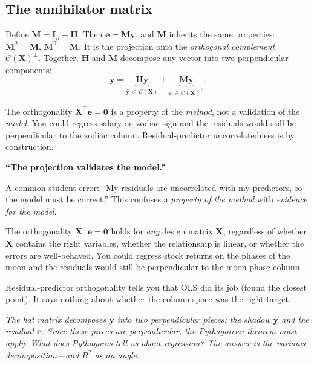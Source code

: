 \documentclass[11pt,a4paper]{article}
\theoremstyle{plain}
\theoremstyle{definition}
\newcommand{\yhat}{\hat{\bm{y}}}
\newcommand{\bX}{\bm{X}}
\newcommand{\by}{\bm{y}}
\newcommand{\be}{\bm{e}}
\newcommand{\bH}{\bm{H}}
\newcommand{\bM}{\bm{M}}
\newcommand{\bI}{\bm{I}}
\newcommand{\Col}{\mathcal{C}}
\begin{document}
\subsection{The annihilator matrix}

Define $\bM = \bI_n - \bH$. Then $\be = \bM\by$, and $\bM$ inherits the
same properties: $\bM^2 = \bM$, $\bM^\top = \bM$.
It is the projection onto the \emph{orthogonal complement}
$\Col(\bX)^\perp$.
Together, $\bH$ and $\bM$ decompose any vector into two perpendicular
components:
\[
  \by = \underbrace{\bH\by}_{\yhat\,\in\,\Col(\bX)}
      + \underbrace{\bM\by}_{\be\,\in\,\Col(\bX)^\perp}.
\]

\begin{warning}
The orthogonality $\bX^\top\be=\bm{0}$ is a property of the
\emph{method}, not a validation of the \emph{model}.
You could regress salary on zodiac sign and the residuals would still
be perpendicular to the zodiac column.
Residual-predictor uncorrelatedness is by construction.
\end{warning}

\begin{misconception}
\textbf{``The projection validates the model.''}

A common student error: ``My residuals are uncorrelated with my
predictors, so the model must be correct.'' This confuses a
\emph{property of the method} with \emph{evidence for the model}.

The orthogonality $\bX^\top \be = \bm{0}$ holds for \emph{any}
design matrix $\bX$, regardless of whether $\bX$ contains the
right variables, whether the relationship is linear, or whether
the errors are well-behaved. You could regress stock returns on
the phases of the moon and the residuals would still be
perpendicular to the moon-phase column.

Residual-predictor orthogonality tells you that OLS did its job
(found the closest point). It says nothing about whether the
column space was the right target.
\end{misconception}

\medskip
\noindent\textit{The hat matrix decomposes $\by$ into two perpendicular
pieces: the shadow $\yhat$ and the residual $\be$.
Since these pieces are perpendicular, the Pythagorean theorem must
apply.
What does Pythagoras tell us about regression?
The answer is the variance decomposition---and $R^2$ as an angle.}
\end{document}
